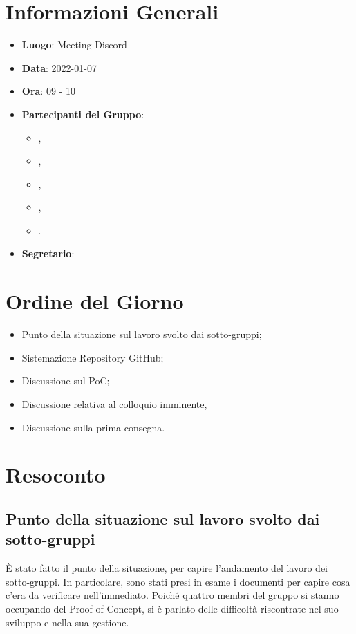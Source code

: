 \section{Informazioni Generali}

\begin{itemize}
\item{\textbf{Luogo}}: Meeting Discord
\item{\textbf{Data}}: 2022-01-07
\item{\textbf{Ora}}: 09 - 10
\item{\textbf{Partecipanti del Gruppo}}: 
	\begin{itemize}
	\item{\EP{},} 
	\item{\FP{},}
	\item{\GC{},}
	\item{\LW{},}
	\item{\MB{}.}
	\end{itemize} 
\item{\textbf{Segretario}}: \GC{}	
\end{itemize}

\section{Ordine del Giorno}
\begin{itemize}
\item{Punto della situazione sul lavoro svolto dai sotto-gruppi;}
\item{Sistemazione Repository GitHub;}
\item{Discussione sul PoC;}
\item{Discussione relativa al colloquio imminente,}
\item{Discussione sulla prima consegna.}
\end{itemize}

\section{Resoconto}

\subsection{Punto della situazione sul lavoro svolto dai sotto-gruppi}

È stato fatto il punto della situazione, per capire l'andamento del lavoro dei sotto-gruppi. In particolare, sono stati presi in esame i documenti per capire cosa c'era da verificare nell'immediato.
Poiché quattro membri del gruppo si stanno occupando del Proof of Concept, si è parlato delle difficoltà riscontrate nel suo sviluppo e nella sua gestione.     

